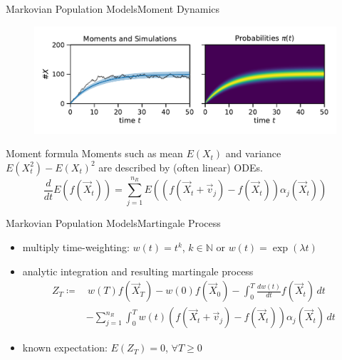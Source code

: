 \documentclass[10pt]{beamer}
\newcommand{\expSym}{{E}}
\newcommand{\E}[1]{\ensuremath{\expSym\left(#1\right)}}
\begin{document}
\begin{frame}{Markovian Population Models}{Moment Dynamics}
    \begin{figure}
        \centering
    \includegraphics[scale=.45]{../gfx/momsandprobs.pdf}
    \end{figure}
          \begin{block}{Moment formula}
              Moments such as mean $\E{X_t}$ and variance $\E{X_t^2}-\E{X_t}^2$ are described by (often {linear}) ODEs.
        \begin{equation*}
            \frac{d}{dt}\E{f({\vec{ X}}_t)} = \sum_{j=1}^{n_R}\E{\left(f({\vec X_t +
            \vec{v}_j}) - f(\vec X_t)\right)\alpha_j(\vec X_t)}
        \end{equation*}
          \end{block}
\end{frame}

\begin{frame}{Markovian Population Models}{Martingale Process}
    \begin{itemize}
    \item multiply time-weighting: $w(t)=t^k$, $k\in\mathbb{N}$ or $w(t)=\exp(\lambda t)$
    \item analytic integration and resulting martingale process
        \begin{equation*}
            \begin{split}
            Z_T\coloneqq&\,w(T)f(\vec X_T) - w(0)f(\vec X_{0}) -
            \int_{0}^T\frac{dw(t)}{dt}f(\vec X_t)\,dt\\
            &-\sum_{j=1}^{n_R}\int_{0}^Tw(t)
                 (f(\vec X_t+\vec v_j) - f(\vec X_t))\alpha_j(\vec X_t)\,dt
         \end{split}
        \end{equation*}
    \item known expectation: $\E{Z_T}=0$, $\forall T\geq 0$
  \end{itemize}
\end{frame}
\end{document}
